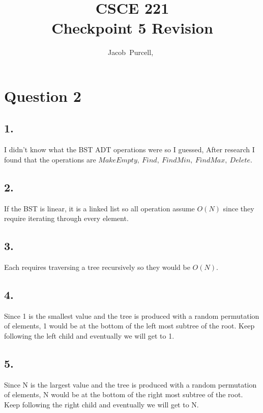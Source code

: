 \documentclass[journal]{IEEEtran}
\begin{document}
\title{CSCE 221 \\ Checkpoint 5 Revision}

\author{Jacob~Purcell,~}

\maketitle

\section*{Question 2}

    \subsection*{1.}
    I didn't know what the BST ADT operations were so I guessed,
    After research I found that the operations are $\boxed{MakeEmpty,~Find,~FindMin,~FindMax,~Delete}$.

    \subsection*{2.}
    If the BST is linear, it is a linked list so all operation assume $\boxed{O(N)}$ since they require iterating through every element.

    \subsection*{3.}
    Each requires traversing a tree recursively so they would be $O(N)$.

    \subsection*{4.}
    Since 1 is the smallest value and the tree is produced with a random permutation of elements, 1 would be at the bottom of the left most subtree of the root.
    Keep following the left child and eventually we will get to 1.

    \subsection*{5.}
    Since N is the largest value and the tree is produced with a random permutation of elements, N would be at the bottom of the right most subtree of the root.
    Keep following the right child and eventually we will get to N.
\end{document}
